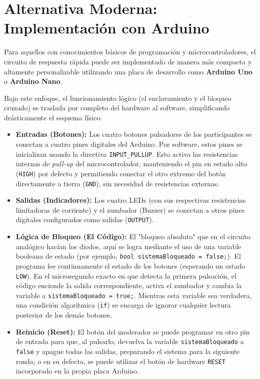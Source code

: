 \documentclass[12pt,a4paper]{article}
\begin{document}
\section{Alternativa Moderna: Implementación con Arduino}
Para aquellos con conocimientos básicos de programación y microcontroladores, el circuito de respuesta rápida puede ser implementado de manera más compacta y altamente personalizable utilizando una placa de desarrollo como \textbf{Arduino Uno} o \textbf{Arduino Nano}.

Bajo este enfoque, el funcionamiento lógico (el enclavamiento y el bloqueo cruzado) se traslada por completo del hardware al software, simplificando drásticamente el esquema físico:

\begin{itemize}
    \item \textbf{Entradas (Botones):} Los cuatro botones pulsadores de los participantes se conectan a cuatro pines digitales del Arduino. Por software, estos pines se inicializan usando la directiva \texttt{INPUT\_PULLUP}. Esto activa las resistencias internas de \textit{pull-up} del microcontrolador, manteniendo el pin en estado alto (\texttt{HIGH}) por defecto y permitiendo conectar el otro extremo del botón directamente a tierra (\texttt{GND}), sin necesidad de resistencias externas.
    
    \item \textbf{Salidas (Indicadores):} Los cuatro LEDs (con sus respectivas resistencias limitadoras de corriente) y el zumbador (Buzzer) se conectan a otros pines digitales configurados como salidas (\texttt{OUTPUT}).
    
    \item \textbf{Lógica de Bloqueo (El Código):} El "bloqueo absoluto" que en el circuito analógico hacían los diodos, aquí se logra mediante el uso de una variable booleana de estado (por ejemplo, \texttt{bool sistemaBloqueado = false;}). El programa lee continuamente el estado de los botones (esperando un estado \texttt{LOW}). En el microsegundo exacto en que detecta la primera pulsación, el código enciende la salida correspondiente, activa el zumbador y cambia la variable a \texttt{sistemaBloqueado = true;}. Mientras esta variable sea verdadera, una condición algorítmica (\texttt{if}) se encarga de ignorar cualquier lectura posterior de los demás botones.
    
    \item \textbf{Reinicio (Reset):} El botón del moderador se puede programar en otro pin de entrada para que, al pulsarlo, devuelva la variable \texttt{sistemaBloqueado} a \texttt{false} y apague todas las salidas, preparando el sistema para la siguiente ronda; o en su defecto, se puede utilizar el botón de hardware \texttt{RESET} incorporado en la propia placa Arduino.
\end{itemize}
\end{document}
